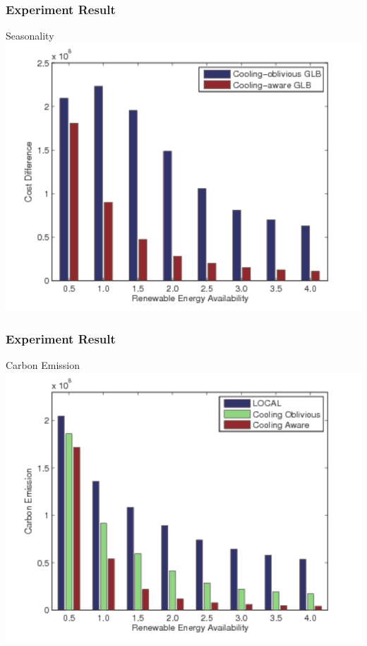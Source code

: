 \documentclass{beamer}
\begin{document}
%
%
\begin{frame}
\frametitle{Experiment Result}
\begin{block}
{Seasonality}
\includegraphics[scale = 0.5]{cost_diff.pdf}
\end{block}
\end{frame}
%
%
\begin{frame}
\frametitle{Experiment Result}
\begin{block}
{Carbon Emission}
\includegraphics[scale = 0.5]{carbon_summer.pdf}
\end{block}
\end{frame}
%
%
\end{document}
